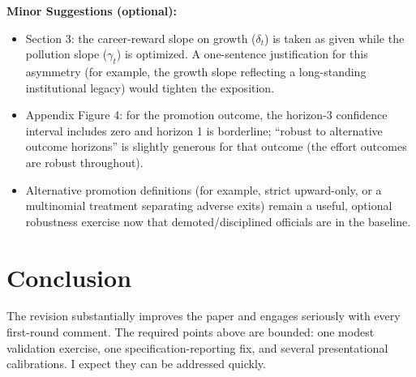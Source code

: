 \documentclass[12pt]{article}
\begin{document}
\noindent \textbf{Minor Suggestions (optional):}
\begin{itemize}
    \item Section 3: the career-reward slope on growth ($\delta_t$) is taken as given while the pollution slope ($\gamma_t$) is optimized. A one-sentence justification for this asymmetry (for example, the growth slope reflecting a long-standing institutional legacy) would tighten the exposition.

    \item Appendix Figure 4: for the promotion outcome, the horizon-3 confidence interval includes zero and horizon 1 is borderline; ``robust to alternative outcome horizons'' is slightly generous for that outcome (the effort outcomes are robust throughout).

    \item Alternative promotion definitions (for example, strict upward-only, or a multinomial treatment separating adverse exits) remain a useful, optional robustness exercise now that demoted/disciplined officials are in the baseline.
\end{itemize}

\section{Conclusion}

The revision substantially improves the paper and engages seriously with every first-round comment. The required points above are bounded: one modest validation exercise, one specification-reporting fix, and several presentational calibrations. I expect they can be addressed quickly.
\end{document}
